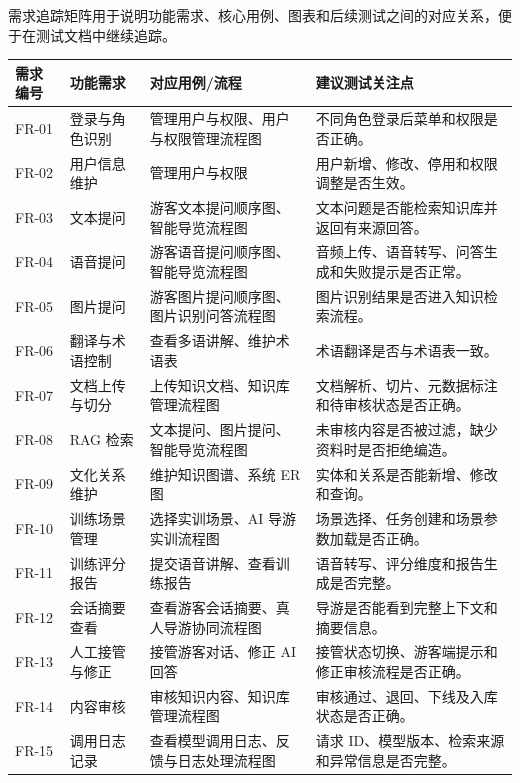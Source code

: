 需求追踪矩阵用于说明功能需求、核心用例、图表和后续测试之间的对应关系，便于在测试文档中继续追踪。

\begin{longtable}{p{1.4cm}p{3.1cm}p{4.3cm}p{3.8cm}}
\toprule
需求编号 & 功能需求 & 对应用例/流程 & 建议测试关注点 \\
\midrule
FR-01 & 登录与角色识别 & 管理用户与权限、用户与权限管理流程图 & 不同角色登录后菜单和权限是否正确。 \\
FR-02 & 用户信息维护 & 管理用户与权限 & 用户新增、修改、停用和权限调整是否生效。 \\
FR-03 & 文本提问 & 游客文本提问顺序图、智能导览流程图 & 文本问题是否能检索知识库并返回有来源回答。 \\
FR-04 & 语音提问 & 游客语音提问顺序图、智能导览流程图 & 音频上传、语音转写、问答生成和失败提示是否正常。 \\
FR-05 & 图片提问 & 游客图片提问顺序图、图片识别问答流程图 & 图片识别结果是否进入知识检索流程。 \\
FR-06 & 翻译与术语控制 & 查看多语讲解、维护术语表 & 术语翻译是否与术语表一致。 \\
FR-07 & 文档上传与切分 & 上传知识文档、知识库管理流程图 & 文档解析、切片、元数据标注和待审核状态是否正确。 \\
FR-08 & RAG 检索 & 文本提问、图片提问、智能导览流程图 & 未审核内容是否被过滤，缺少资料时是否拒绝编造。 \\
FR-09 & 文化关系维护 & 维护知识图谱、系统 ER 图 & 实体和关系是否能新增、修改和查询。 \\
FR-10 & 训练场景管理 & 选择实训场景、AI 导游实训流程图 & 场景选择、任务创建和场景参数加载是否正确。 \\
FR-11 & 训练评分报告 & 提交语音讲解、查看训练报告 & 语音转写、评分维度和报告生成是否完整。 \\
FR-12 & 会话摘要查看 & 查看游客会话摘要、真人导游协同流程图 & 导游是否能看到完整上下文和摘要信息。 \\
FR-13 & 人工接管与修正 & 接管游客对话、修正 AI 回答 & 接管状态切换、游客端提示和修正审核流程是否正确。 \\
FR-14 & 内容审核 & 审核知识内容、知识库管理流程图 & 审核通过、退回、下线及入库状态是否正确。 \\
FR-15 & 调用日志记录 & 查看模型调用日志、反馈与日志处理流程图 & 请求 ID、模型版本、检索来源和异常信息是否完整。 \\
\bottomrule
\end{longtable}



